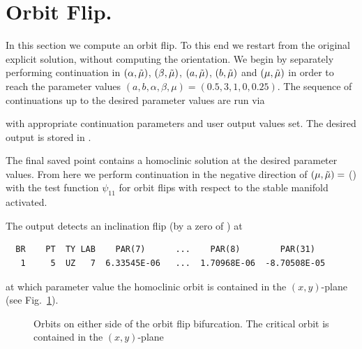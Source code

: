 \documentclass[12pt]{report}
\begin{document}
\section{Orbit Flip.}
In this section we compute an orbit flip. To this end we restart
from the original explicit solution, without computing the orientation. We 
begin by separately performing continuation in $(\alpha,\tilde \mu)$, 
$(\beta,\tilde \mu)$, $(a,\tilde \mu)$, $(b,\tilde \mu)$ and $(\mu, \tilde \mu)$
in order to reach the parameter values 
$(a,b,\alpha,\beta, \mu)=(0.5,3,1,0,0.25)$.
The sequence of continuations up to the desired parameter values 
are run via
\begin{center}
\end{center}
with appropriate continuation parameters and user output values
set. The desired output is stored in .

The final saved point  contains a homoclinic solution at
the desired parameter values. From here we perform continuation in
the negative direction of $(\mu,\tilde \mu)=$ () with
the test function $\psi_{11}$ for orbit flips with respect to the
stable manifold activated.
\begin{center}
\end{center}
The output detects an inclination flip (by a zero of ) 
at  
\begin{verbatim}
  BR    PT  TY LAB    PAR(7)      ...    PAR(8)        PAR(31)    
   1     5  UZ   7  6.33545E-06   ...  1.70968E-06  -8.70508E-05
\end{verbatim}
at which parameter value the homoclinic orbit is contained in the $(x,y)$-plane
(see Fig.\ \ref{Ftest2}).

\begin{figure}[t]
\epsfysize 9.0cm
\centerline{}
\caption{Orbits on either side of the orbit flip bifurcation. The critical
orbit is contained in the $(x,y)$-plane}
\label{Ftest2}
\end{figure}
\end{document}

